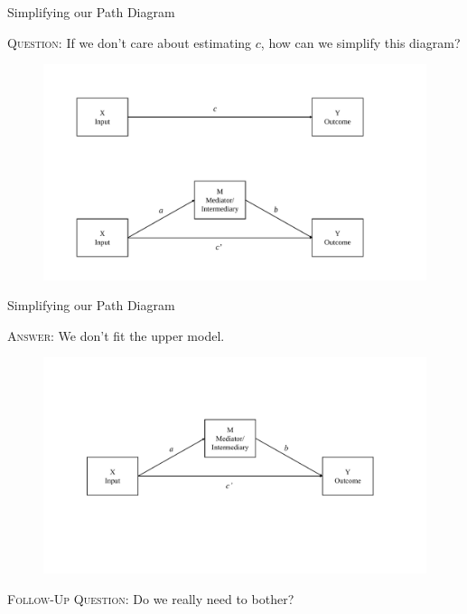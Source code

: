 \documentclass{beamer}
\begin{document}
\begin{frame}{Simplifying our Path Diagram}

  \textsc{Question:} If we don't care about estimating $c$, how can we
  simplify this diagram?

  \begin{figure}
    \includegraphics[width=\textwidth]{figures/simpleMediationPathDiagram.pdf}
  \end{figure}

\end{frame}



\begin{frame}{Simplifying our Path Diagram}

  \textsc{Answer:} We don't fit the upper model.
  
  \vspace{-12pt}
  
  \begin{figure}
    \includegraphics[width=\textwidth]{figures/mediationTriadPathDiagram.pdf}
  \end{figure}
  
  \vspace{-24pt}
  
  \textsc{Follow-Up Question:} Do we really need to bother?

\end{frame}
\end{document}
